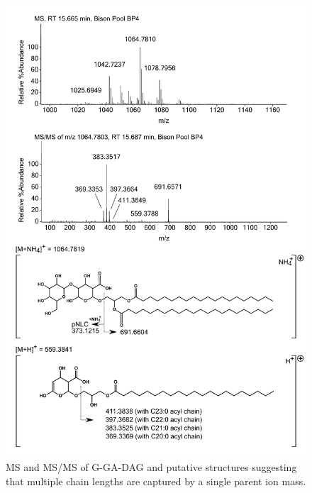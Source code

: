\begin{figure}[h]
       \includegraphics[width=\linewidth]{figs_app1/G-GA-DAG}
       \caption{MS and MS/MS of G-GA-DAG and putative structures suggesting that multiple chain lengths are captured by a single parent ion mass.}
\label{fig:G-GA-DAG}
\end{figure}